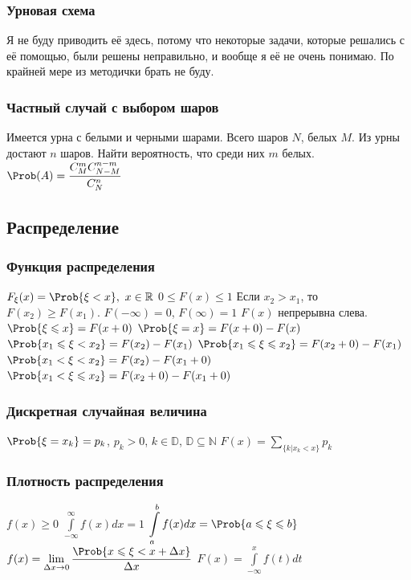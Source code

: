 \subsubsection{Урновая схема}
Я не буду приводить её здесь, потому что некоторые задачи, которые решались с её помощью, были решены неправильно, и вообще я её не очень понимаю. По крайней мере из методички брать не буду.
\subsubsection{Частный случай с выбором шаров}
Имеется урна с белыми и черными шарами. Всего шаров $N$, белых $M$. Из урны достают $n$ шаров. Найти вероятность, что среди них $m$ белых.
$\displaystyle \Prob(A) = \frac{C_M^m C_{N-M}^{n-m}}{C_N^n} $
\newcommand{\M}{\mathsf{M}}
\newcommand{\D}{\mathsf{D}}
\newcommand{\cov}{\mathrm{cov}}
\subsection{Распределение}
\subsubsection{Функция распределения}
$\displaystyle F_\xi(x) = \Prob\{\xi < x\},\ x\in\mathbb{R} $
$\displaystyle 0 \leqslant F(x) \leqslant 1 $
Если $x_2 > x_1 $, то $F(x_2)\geqslant F(x_1)$.
$F(-\infty) = 0 $, $F(\infty) = 1$
$\displaystyle F(x) $ непрерывна слева.
$\displaystyle \Prob\{\xi \leqslant x\} = F(x + 0) $
$\displaystyle \Prob\{\xi = x\} = F(x+0) - F(x) $
$\displaystyle \Prob\{x_1 \leqslant \xi < x_2\} = F(x_2) - F(x_1) $
$\displaystyle \Prob\{x_1 \leqslant \xi \leqslant x_2\} = F(x_2+0) - F(x_1) $
$\displaystyle \Prob\{x_1 < \xi < x_2\} = F(x_2) - F(x_1+0) $
$\displaystyle \Prob\{x_1 < \xi \leqslant x_2\} = F(x_2+0) - F(x_1+0) $
\subsubsection{Дискретная случайная величина}
$\Prob\{\xi = x_k\} = p_k $, $p_k > 0$, $k \in \mathbb{D}$, $\mathbb{D} \subseteq \mathbb{N}$
$\displaystyle F(x) = \sum_{\{ k | x_k < x\}} p_k $
\subsubsection{Плотность распределения}
$\displaystyle f(x) \geqslant 0 $
$\displaystyle \int\limits_{-\infty}^{\infty} f(x) dx = 1 $
$\displaystyle \int\limits_{a}^{b} f(x) dx = \Prob\{a\leqslant \xi \leqslant b\} $
$\displaystyle f(x) = \lim_{\Delta x\to 0} \frac{\Prob\{x\leqslant \xi < x + \Delta x\}}{\Delta x} $
$\displaystyle F(x) = \int\limits_{-\infty}^{x} f(t) dt $
